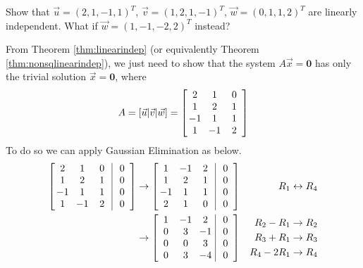 \begin{exmp}
Show that $\vec{u} = (2,1,-1,1)^T$, $\vec{v} = (1,2,1,-1)^T$, $\vec{w} = (0,1,1,2)^T$ are linearly independent. What if $\vec{w} = (1,-1,-2,2)^T$ instead?
\end{exmp}
\begin{solution}
From Theorem \ref{thm:linearindep} (or equivalently Theorem \ref{thm:nonsqlinearindep}), we just need to show that the system $A\vec{x} = \textbf{0}$ has only the trivial solution $\vec{x} = \textbf{0}$, where
\begin{align*}
A = [\vec{u}|\vec{v}|\vec{w}] =
\left[
\begin{array}{@{\;}wc{10pt}wc{10pt}wc{10pt}@{\;}}
2 & 1 & 0 \\
1 & 2 & 1 \\
-1 & 1 & 1 \\
1 & -1 & 2
\end{array}
\right]
\end{align*}
To do so we can apply Gaussian Elimination as below.
\begin{align*}
\left[
\begin{array}{@{\;}wc{10pt}wc{10pt}wc{10pt}|wc{10pt}@{\;}}
2 & 1 & 0 & 0\\
1 & 2 & 1 & 0\\
-1 & 1 & 1 & 0\\
1 & -1 & 2 & 0
\end{array}
\right]
&\to
\left[
\begin{array}{@{\;}wc{10pt}wc{10pt}wc{10pt}|wc{10pt}@{\;}}
1 & -1 & 2 & 0 \\
1 & 2 & 1 & 0\\
-1 & 1 & 1 & 0\\
2 & 1 & 0 & 0\\
\end{array}
\right] & R_1 \leftrightarrow R_4 \\
&\to
\left[
\begin{array}{@{\;}wc{10pt}wc{10pt}wc{10pt}|wc{10pt}@{\;}}
1 & -1 & 2 & 0 \\
0 & 3 & -1 & 0\\
0 & 0 & 3 & 0\\
0 & 3 & -4 & 0\\
\end{array}
\right] & 
\begin{aligned}
R_2 - R_1 &\to R_2 \\
R_3 + R_1 &\to R_3 \\
R_4 - 2R_1 &\to R_4 
\end{aligned}\\

\end{align*}
\end{solution}
